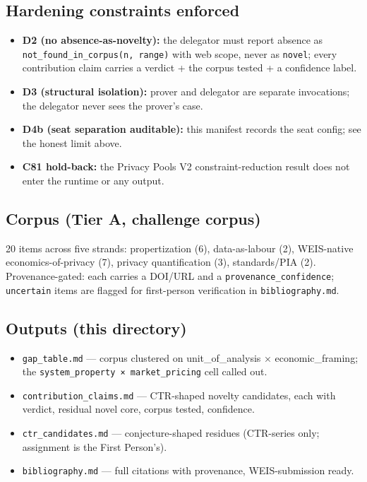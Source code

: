 \documentclass[
  11pt,
]{article}
\providecommand{\tightlist}{%
  \setlength{\itemsep}{0pt}\setlength{\parskip}{0pt}}
\begin{document}
\subsection{Hardening constraints
enforced}\label{hardening-constraints-enforced}

\begin{itemize}
\tightlist
\item
  \textbf{D2 (no absence-as-novelty):} the delegator must report absence
  as \texttt{not\_found\_in\_corpus(n,\ range)} with web scope, never as
  \texttt{novel}; every contribution claim carries a verdict + the
  corpus tested + a confidence label.
\item
  \textbf{D3 (structural isolation):} prover and delegator are separate
  invocations; the delegator never sees the prover's case.
\item
  \textbf{D4b (seat separation auditable):} this manifest records the
  seat config; see the honest limit above.
\item
  \textbf{C81 hold-back:} the Privacy Pools V2 constraint-reduction
  result does not enter the runtime or any output.
\end{itemize}

\subsection{Corpus (Tier A, challenge
corpus)}\label{corpus-tier-a-challenge-corpus}

20 items across five strands: propertization (6), data-as-labour (2),
WEIS-native economics-of-privacy (7), privacy quantification (3),
standards/PIA (2). Provenance-gated: each carries a DOI/URL and a
\texttt{provenance\_confidence}; \texttt{uncertain} items are flagged
for first-person verification in \texttt{bibliography.md}.

\subsection{Outputs (this directory)}\label{outputs-this-directory}

\begin{itemize}
\tightlist
\item
  \texttt{gap\_table.md} --- corpus clustered on unit\_of\_analysis ×
  economic\_framing; the \texttt{system\_property\ ×\ market\_pricing}
  cell called out.
\item
  \texttt{contribution\_claims.md} --- CTR-shaped novelty candidates,
  each with verdict, residual novel core, corpus tested, confidence.
\item
  \texttt{ctr\_candidates.md} --- conjecture-shaped residues (CTR-series
  only; assignment is the First Person's).
\item
  \texttt{bibliography.md} --- full citations with provenance,
  WEIS-submission ready.
\end{itemize}
\end{document}
